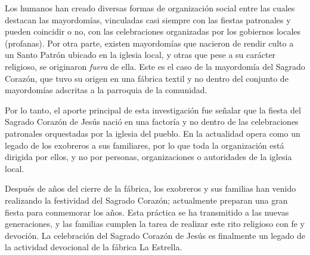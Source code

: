 \documentclass[14pt,letterpaper,twoside]{extbook} %
\begin{document}
Los humanos han creado diversas formas de organización social entre las cuales destacan las mayordomías, vinculadas casi siempre con las fiestas patronales y pueden coincidir o no, con las celebraciones organizadas por los gobiernos locales (profanas). Por otra parte, existen
mayordomías que nacieron de rendir culto a un Santo Patrón ubicado en la iglesia local, y otras que pese a su carácter religioso, se originaron \textit{fuera} de ella. Este es el caso de la mayordomía del Sagrado Corazón, que tuvo su origen en una fábrica textil y no dentro del conjunto de mayordomías adscritas a la parroquia de la comunidad.

Por lo tanto, el aporte principal de esta investigación fue señalar que la fiesta del Sagrado Corazón de Jesús nació en una factoría y no dentro de las celebraciones patronales orquestadas por la iglesia del pueblo. En la actualidad opera como un legado de los exobreros a sus familiares, por lo que toda la organización está dirigida por ellos, y no por personas, organizaciones o autoridades de la iglesia local.

Después de  años del cierre de la fábrica, los exobreros y sus familias han venido realizando la festividad del Sagrado Corazón; actualmente preparan una gran fiesta para conmemorar los  años. Esta práctica se ha transmitido a las nuevas generaciones, y las familias cumplen la tarea de realizar este rito religioso con fe y devoción. La celebración del Sagrado Corazón de Jesús es finalmente un legado de la actividad devocional de la fábrica La Estrella.

\begin{center}
\dag
\end{center}

\end{document}
